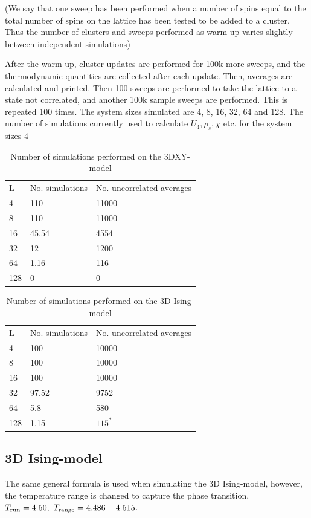 (We say that one sweep has been performed when a number of spins equal to the total number of spins on the lattice has been tested to be added to a cluster.
Thus the number of clusters and sweeps performed as warm-up varies slightly between independent simulations)

After the warm-up, cluster updates are performed for 100k more sweeps, and the thermodynamic quantities are collected after each update. Then, averages are calculated and printed. Then 100 sweeps are performed to take the lattice to a state not correlated, and another 100k sample sweeps are performed. This is repeated 100 times. The system sizes simulated are 4, 8, 16, 32, 64 and 128. 
The number of simulations currently used to calculate $U_4, \rho_s, \chi $ etc. for the system sizes 4


\begin{table}[htpb]
\begin{center}
\begin{tabular}{l l l}
  L & No. simulations & No. uncorrelated averages\\
  4 & 110 & 11000\\
  8 & 110 & 11000\\
  16 & 45.54 & 4554\\
  32 & 12 & 1200\\
  64 & 1.16 & 116 \\
  128 & 0  & 0 \\
\end{tabular}
\end{center}
\caption{Number of simulations performed on the 3DXY-model}
\end{table}

\begin{table}[htpb]
\begin{center}
\begin{tabular}{l l l}
  L & No. simulations & No. uncorrelated averages\\
  4 & 100 & 10000\\
  8 & 100 & 10000\\
  16 & 100 & 10000\\
  32 & 97.52 & 9752 \\
  64 & 5.8 & 580 \\
  128 & 1.15  & $115^{*}$ \\
\end{tabular}
\end{center}
\caption{Number of simulations performed on the 3D Ising-model}
\end{table}
\subsection{3D Ising-model}
The same general formula is used when simulating the 3D Ising-model, however, the temperature range is changed to capture the phase transition, $T_{\textrm{run}} = 4.50, ~ T_{\textrm{range}} = 4.486-4.515$.



